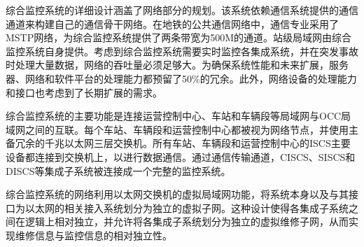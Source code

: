 综合监控系统的详细设计涵盖了网络部分的规划。该系统依赖通信系统提供的通信通道来构建自己的通信骨干网络。在地铁的公共通信网络中，通信专业采用了MSTP网络，为综合监控系统提供了两条带宽为500M的通道。站级局域网由综合监控系统自身提供。考虑到综合监控系统需要实时监控各集成系统，并在突发事故时处理大量数据，网络的吞吐量必须足够大。为确保系统性能和未来扩展，服务器、网络和软件平台的处理能力都预留了50\%的冗余。此外，网络设备的处理能力和接口也考虑到了长期扩展的需求。

综合监控系统的主要功能是连接运营控制中心、车站和车辆段等局域网与OCC局域网之间的互联。每个车站、车辆段和运营控制中心都被视为网络节点，并使用主备冗余的千兆以太网三层交换机。所有车站、车辆段和运营控制中心的ISCS主要设备都连接到交换机上，以进行数据通信。通过通信传输通道，CISCS、SISCS和DISCS等集成子系统被连接成一个完整的监控系统。

综合监控系统的网络利用以太网交换机的虚拟局域网功能，将系统本身以及与其接口为以太网的相关接入系统划分为独立的虚拟子网。这种设计使得各集成子系统之间在逻辑上相对独立，并允许将各集成子系统划分为独立的虚拟维修子网，从而实现维修信息与监控信息的相对独立性。